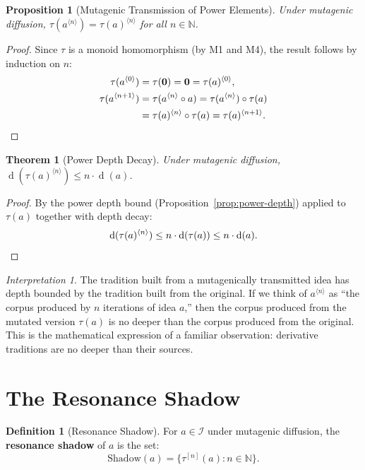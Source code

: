 \documentclass[11pt,openany]{book}
\theoremstyle{definition}
\newtheorem{definition}[axiom]{Definition}
\theoremstyle{plain}
\newtheorem{theorem}[axiom]{Theorem}
\newtheorem{proposition}[axiom]{Proposition}
\theoremstyle{remark}
\newtheorem{interpretation}[axiom]{Interpretation}
\newcommand{\IS}{\mathcal{I}}               %
\newcommand{\compose}{\circ}                 %
\newcommand{\void}{\mathbf{0}}              %
\newcommand{\depth}{\operatorname{d}}       %
\newcommand{\transmit}{\tau}                 %
\newcommand{\compN}[2]{#1^{\langle #2 \rangle}} %
\begin{document}
\begin{proposition}[Mutagenic Transmission of Power Elements]
Under mutagenic diffusion, $\transmit(\compN{a}{n}) = \compN{\transmit(a)}{n}$ for all $n \in \mathbb{N}$.
\end{proposition}

\begin{proof}
Since $\transmit$ is a monoid homomorphism (by M1 and M4), the result follows by induction on $n$:
\begin{align*}
\transmit(\compN{a}{0}) &= \transmit(\void) = \void = \compN{\transmit(a)}{0}, \\
\transmit(\compN{a}{n+1}) &= \transmit(\compN{a}{n} \compose a) = \transmit(\compN{a}{n}) \compose \transmit(a) \\
&= \compN{\transmit(a)}{n} \compose \transmit(a) = \compN{\transmit(a)}{n+1}. \qedhere
\end{align*}
\end{proof}

\begin{theorem}[Power Depth Decay]
Under mutagenic diffusion, $\depth(\compN{\transmit(a)}{n}) \leq n \cdot \depth(a)$.
\end{theorem}

\begin{proof}
By the power depth bound (Proposition~\ref{prop:power-depth}) applied to $\transmit(a)$ together with depth decay:
\[
\depth(\compN{\transmit(a)}{n}) \leq n \cdot \depth(\transmit(a)) \leq n \cdot \depth(a). \qedhere
\]
\end{proof}

\begin{interpretation}
The tradition built from a mutagenically transmitted idea has depth bounded by the tradition built from the original. If we think of $\compN{a}{n}$ as ``the corpus produced by $n$ iterations of idea $a$,'' then the corpus produced from the mutated version $\transmit(a)$ is no deeper than the corpus produced from the original. This is the mathematical expression of a familiar observation: derivative traditions are no deeper than their sources.
\end{interpretation}

\section{The Resonance Shadow}

\begin{definition}[Resonance Shadow]
For $a \in \IS$ under mutagenic diffusion, the \textbf{resonance shadow} of $a$ is the set:
\[
\mathrm{Shadow}(a) = \{ \transmit^{[n]}(a) : n \in \mathbb{N} \}.
\]
\end{definition}
\end{document}
